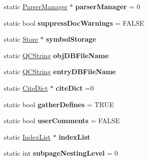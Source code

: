 \begin{DoxyCompactItemize}
\item 
\hypertarget{class_doxygen_a4b5f6268fe498ff0581ade09e3b92bf6}{static \hyperlink{class_parser_manager}{Parser\-Manager} $\ast$ {\bfseries parser\-Manager} = 0}\label{class_doxygen_a4b5f6268fe498ff0581ade09e3b92bf6}

\item 
\hypertarget{class_doxygen_ac07fb219221abab55713ca63b9869afa}{static bool {\bfseries suppress\-Doc\-Warnings} = F\-A\-L\-S\-E}\label{class_doxygen_ac07fb219221abab55713ca63b9869afa}

\item 
\hypertarget{class_doxygen_aeee5211d9dfa858ca8d9aa79da96e446}{static \hyperlink{class_store}{Store} $\ast$ {\bfseries symbol\-Storage}}\label{class_doxygen_aeee5211d9dfa858ca8d9aa79da96e446}

\item 
\hypertarget{class_doxygen_a801bf8c9d9dac35220f368405deeed13}{static \hyperlink{class_q_c_string}{Q\-C\-String} {\bfseries obj\-D\-B\-File\-Name}}\label{class_doxygen_a801bf8c9d9dac35220f368405deeed13}

\item 
\hypertarget{class_doxygen_ae3bfe16588975de30201669310514228}{static \hyperlink{class_q_c_string}{Q\-C\-String} {\bfseries entry\-D\-B\-File\-Name}}\label{class_doxygen_ae3bfe16588975de30201669310514228}

\item 
\hypertarget{class_doxygen_a01913e8e84d66de6a0963289b9d54f07}{static \hyperlink{class_cite_dict}{Cite\-Dict} $\ast$ {\bfseries cite\-Dict} =0}\label{class_doxygen_a01913e8e84d66de6a0963289b9d54f07}

\item 
\hypertarget{class_doxygen_a5f7d9e3582f802d22b46ee6cd14a8ac3}{static bool {\bfseries gather\-Defines} = T\-R\-U\-E}\label{class_doxygen_a5f7d9e3582f802d22b46ee6cd14a8ac3}

\item 
\hypertarget{class_doxygen_aaec0b8b76e2c91a179bb1b308f44a16a}{static bool {\bfseries user\-Comments} = F\-A\-L\-S\-E}\label{class_doxygen_aaec0b8b76e2c91a179bb1b308f44a16a}

\item 
\hypertarget{class_doxygen_aad2d4f015dd00ce7453deef64ad7f057}{static \hyperlink{class_index_list}{Index\-List} $\ast$ {\bfseries index\-List}}\label{class_doxygen_aad2d4f015dd00ce7453deef64ad7f057}

\item 
\hypertarget{class_doxygen_a9112431297511309edbf1bcb14edc093}{static int {\bfseries subpage\-Nesting\-Level} = 0}\label{class_doxygen_a9112431297511309edbf1bcb14edc093}


\end{DoxyCompactItemize}
